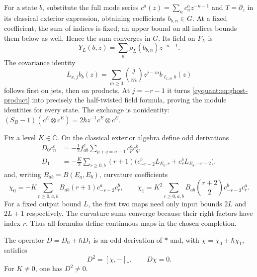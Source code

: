 For a state $b$, substitute the full mode series
$c^a(z)=\sum_nc_n^az^{-n-1}$ and $T=\partial_z$ in its classical
exterior expression, obtaining coefficients $b_{b,n}\in G$.
At a fixed coefficient, the sum of indices is fixed; an upper bound
on all indices bounds them below as well.  Hence the sum converges in
$G$.  Its field on $F_L$ is
\[
 Y_L(b,z)=\sum_n\rho_L(b_{b,n})z^{-n-1}.
\]
The covariance identity
\[
 L_{x,j}b_b(z)=\sum_{m\geq0}\binom jm z^{j-m}b_{\ell_{x,m}b}(z)
\]
follows first on jets, then on products.  At $j=-r-1$ it turns
\eqref{cyquant:eq:ghost-product} into precisely the half-twisted field
formula, proving the module identities for every state.  The exchange
is nonidentity: $(S_B-1)(c^E\otimes c^E)=2\hbar z^{-1}c^E\otimes c^E$.

Fix a level $K\in\mathbb C$.  On the classical exterior algebra define
odd derivations
\begin{equation}\label{cyquant:eq:ghost-D}
 \begin{aligned}
 D_0c_n^c&=-\tfrac12f_{ab}^c\sum_{p+q=n-1}c_p^ac_q^b,\\
 D_1&=-\tfrac K2\sum_{r\geq0,b}(r+1)
       \bigl(c_{-r-2}^bL_{E_b,r}+c_r^bL_{E_b,-r-2}\bigr),
 \end{aligned}
\end{equation}
and, writing $B_{ab}=B(E_a,E_b)$, curvature coefficients
\begin{equation}\label{cyquant:eq:ghost-chi}
 \chi_0=-K\sum_{r\geq0,a,b}B_{ab}(r+1)c_{-r-2}^ac_r^b,
 \qquad
 \chi_1=K^2\sum_{r\geq0,a,b}B_{ab}\binom{r+2}{2}c_{-r-3}^bc_r^a.
\end{equation}
For a fixed output bound $L$, the first two maps need only input
bounds $2L$ and $2L+1$ respectively.  The curvature sums converge
because their right factors have index $r$.  Thus all formulas define
continuous maps in the chosen completion.

\begin{theorem}\label{cyquant:thm:ghost-curved-first}
The operator $D=D_0+\hbar D_1$ is an odd derivation of $*$ and, with
$\chi=\chi_0+\hbar\chi_1$, satisfies
\[
 D^2=[\chi,-]_*,\qquad D\chi=0.
\]
For $K\ne0$, one has $D^2\ne0$.
\end{theorem}


